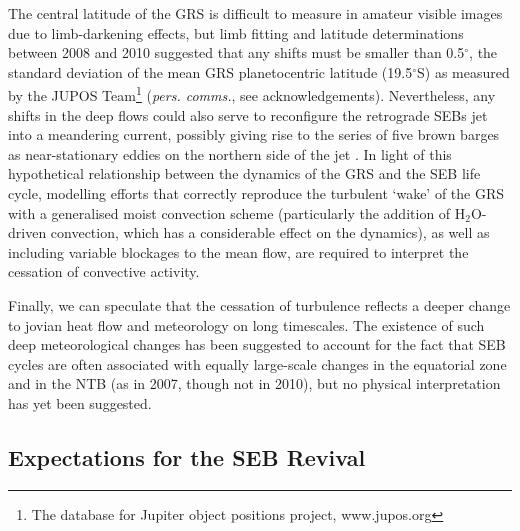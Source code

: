 \documentclass[final,5p,times,twocolumn,authoryear]{elsarticle}
\begin{document}
The central latitude of the GRS is difficult to measure in amateur visible images due to limb-darkening effects, but limb fitting and latitude determinations between 2008 and 2010 suggested that any shifts must be smaller than 0.5$^\circ$, the standard deviation of the mean GRS planetocentric latitude (19.5$^\circ$S) as measured by the JUPOS Team\footnote{The database for Jupiter object positions project, www.jupos.org} (\textit{pers. comms.}, see acknowledgements).  Nevertheless, any shifts in the deep flows could also serve to reconfigure the retrograde SEBs jet into a meandering current, possibly giving rise to the series of five brown barges as near-stationary eddies on the northern side of the jet \citep{10rogers}.   In light of this hypothetical relationship between the dynamics of the GRS and the SEB life cycle, modelling efforts that correctly reproduce the turbulent `wake' of the GRS with a generalised moist convection scheme (particularly the addition of H$_2$O-driven convection, which has a considerable effect on the dynamics), as well as including variable blockages to the mean flow, are required to interpret the cessation of convective activity.   


Finally, we can speculate that the cessation of turbulence reflects a deeper change to jovian heat flow and meteorology on long timescales.  The existence of such deep meteorological changes \citep[known as `global upheavals,'][]{95rogers, 07rogers} has been suggested to account for the fact that SEB cycles are often associated with equally large-scale changes in the equatorial zone and in the NTB (as in 2007, though not in 2010), but no physical interpretation has yet been suggested.

\subsection{Expectations for the SEB Revival}
\end{document}

